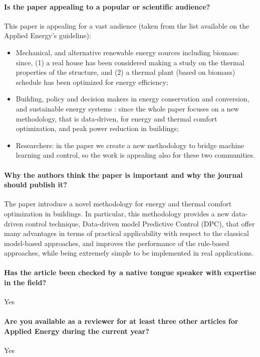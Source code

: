 \documentclass[12pt]{article}
\begin{document}
\paragraph{Is the paper appealing to a popular or scientific audience?}
This paper is appealing for a vast audience (taken from the list available on the Applied Energy's guideline):
\begin{itemize}
	\item Mechanical, and alternative renewable energy sources including biomass: since, (1) a real house has been considered making a study on the thermal properties of the structure, and (2) a thermal plant (based on biomass) schedule has been optimized for energy efficiency;
	\item Building, policy and decision makers in energy conservation and conversion, and sustainable energy systems : since the whole paper focuses on a new methodology, that is data-driven, for energy and thermal comfort optimization, and peak power reduction in buildings;
	\item Researchers: in the paper we create a new methodology to bridge machine learning and control, so the work is appealing also for these two communities.
	
\end{itemize}

\paragraph{Why the authors think the paper is important and why the journal should publish it?}
The paper introduce a novel methodology for energy and thermal comfort optimization in buildings. In particular, this methodology provides a new data-driven control technique, Data-driven model Predictive Control (DPC), that offer many advantages in terms of practical applicability with respect to the classical model-based approaches, and improves the performance of the rule-based approaches, while being extremely simple to be implemented in real applications.
\paragraph{Has the article been checked by a native tongue speaker with expertise in the field?}
Yes
\paragraph{Are you available as a reviewer for at least three other articles for Applied Energy during the current year?}
Yes
\end{document}
